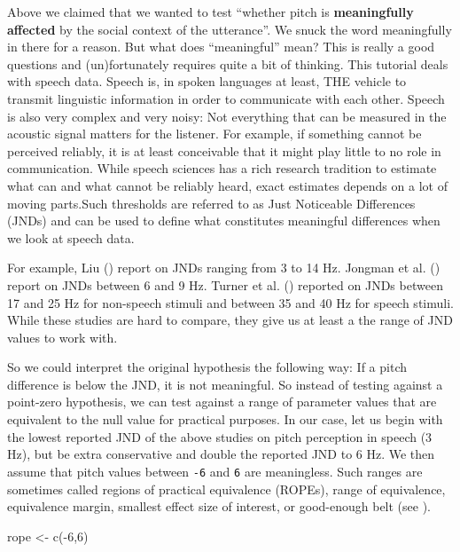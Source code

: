 \documentclass[
  doc,
  floatsintext,
  longtable,
  nolmodern,
  notxfonts,
  notimes,
  colorlinks=true,linkcolor=blue,citecolor=blue,urlcolor=blue]{apa7}
\newenvironment{Shaded}{\begin{snugshade}}{\end{snugshade}}
\newcommand{\DecValTok}[1]{\textcolor[rgb]{0.68,0.00,0.00}{#1}}
\newcommand{\FunctionTok}[1]{\textcolor[rgb]{0.28,0.35,0.67}{#1}}
\newcommand{\NormalTok}[1]{\textcolor[rgb]{0.00,0.23,0.31}{#1}}
\newcommand{\OtherTok}[1]{\textcolor[rgb]{0.00,0.23,0.31}{#1}}
\newcommand{\SpecialCharTok}[1]{\textcolor[rgb]{0.37,0.37,0.37}{#1}}
\begin{document}
Above we claimed that we wanted to test ``whether pitch is
\textbf{meaningfully affected} by the social context of the utterance''.
We snuck the word meaningfully in there for a reason. But what does
``meaningful'' mean? This is really a good questions and (un)fortunately
requires quite a bit of thinking. This tutorial deals with speech data.
Speech is, in spoken languages at least, THE vehicle to transmit
linguistic information in order to communicate with each other. Speech
is also very complex and very noisy: Not everything that can be measured
in the acoustic signal matters for the listener. For example, if
something cannot be perceived reliably, it is at least conceivable that
it might play little to no role in communication. While speech sciences
has a rich research tradition to estimate what can and what cannot be
reliably heard, exact estimates depends on a lot of moving parts.Such
thresholds are referred to as Just Noticeable Differences (JNDs) and can
be used to define what constitutes meaningful differences when we look
at speech data.

For example, Liu () report on JNDs
ranging from 3 to 14 Hz. Jongman et al.
() report on JNDs between 6 and 9
Hz. Turner et al. () reported
on JNDs between 17 and 25 Hz for non-speech stimuli and between 35 and
40 Hz for speech stimuli. While these studies are hard to compare, they
give us at least a the range of JND values to work with.

So we could interpret the original hypothesis the following way: If a
pitch difference is below the JND, it is not meaningful. So instead of
testing against a point-zero hypothesis, we can test against a range of
parameter values that are equivalent to the null value for practical
purposes. In our case, let us begin with the lowest reported JND of the
above studies on pitch perception in speech (3 Hz), but be extra
conservative and double the reported JND to 6 Hz. We then assume that
pitch values between \texttt{-6} and \texttt{6} are meaningless. Such
ranges are sometimes called regions of practical equivalence (ROPEs),
range of equivalence, equivalence margin, smallest effect size of
interest, or good-enough belt (see
).

\begin{Shaded}
\begin{Highlighting}[]
\NormalTok{rope }\OtherTok{\textless{}{-}} \FunctionTok{c}\NormalTok{(}\SpecialCharTok{{-}}\DecValTok{6}\NormalTok{,}\DecValTok{6}\NormalTok{)}
\end{Highlighting}
\end{Shaded}
\end{document}
